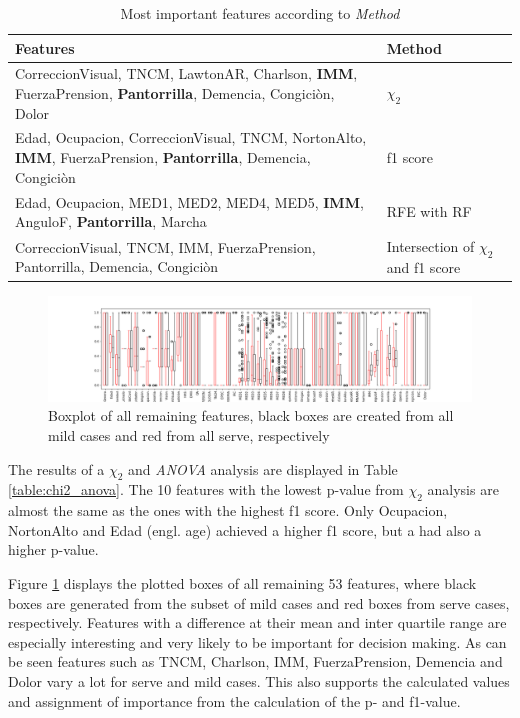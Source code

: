 \documentclass[11pt]{article}
\begin{document}
\begin{table}[b]
\centering
\begin{tabular}{|L{0.6\columnwidth}|C{0.25\columnwidth}|}
\hline
Features & Method \\ \hline
CorreccionVisual, TNCM, LawtonAR, Charlson, \textbf{IMM}, FuerzaPrension, \textbf{Pantorrilla}, Demencia, Congiciòn, Dolor & $\chi_2$ \\ \hline
Edad, Ocupacion, CorreccionVisual, TNCM, NortonAlto, \textbf{IMM}, FuerzaPrension, \textbf{Pantorrilla}, Demencia, Congiciòn & f1 score\\ \hline
Edad, Ocupacion, MED1, MED2, MED4, MED5, \textbf{IMM}, AnguloF, \textbf{Pantorrilla}, Marcha & RFE with RF \\ \hline
CorreccionVisual, TNCM, IMM, FuerzaPrension, Pantorrilla, Demencia, Congiciòn & Intersection of $\chi_2$ and f1 score\\ \hline
\end{tabular}
\caption{Most important features according to \emph{Method}}
\label{table:feature_selection}
\end{table}

\begin{figure}[t]
\includegraphics[width=\linewidth]{boxplot_serve_mild.png}
\caption{Boxplot of all remaining features, black boxes are created from all mild cases and red from all serve, respectively}
\label{fig:boxplots}
\end{figure}

The results of a $\chi_2$ and \emph{ANOVA} analysis are displayed in Table \ref{table:chi2_anova}. The 10 features with the lowest p-value from $\chi_2$ analysis are almost the same as the ones with the highest f1 score. Only Ocupacion, NortonAlto and Edad (engl. age) achieved a higher f1 score, but a had also a higher p-value.


Figure \ref{fig:boxplots} displays the plotted boxes of all remaining 53 features, where black boxes are generated from the subset of mild cases and red boxes from serve cases, respectively. Features with a difference at their mean and inter quartile range are especially interesting and very likely to be important for decision making. As can be seen features such as TNCM, Charlson, IMM, FuerzaPrension, Demencia and Dolor vary a lot for serve and mild cases. This also supports the calculated values and assignment of importance from the calculation of the p- and f1-value.
\end{document}
